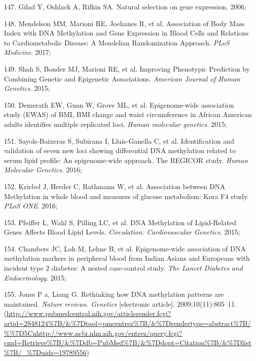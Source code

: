 \documentclass[11pt,oneside]{bristolthesis}
\newenvironment{cslreferences}%
  {}%
  {\par}
\begin{document}
\begin{cslreferences}
\leavevmode\hypertarget{ref-Gilad2006}{}%
147. Gilad Y, Oshlack A, Rifkin SA. Natural selection on gene expression. 2006;

\leavevmode\hypertarget{ref-Mendelson2017}{}%
148. Mendelson MM, Marioni RE, Joehanes R, et al. Association of Body Mass Index with DNA Methylation and Gene Expression in Blood Cells and Relations to Cardiometabolic Disease: A Mendelian Randomization Approach. \emph{PLoS Medicine}. 2017;

\leavevmode\hypertarget{ref-Shah2015}{}%
149. Shah S, Bonder MJ, Marioni RE, et al. Improving Phenotypic Prediction by Combining Genetic and Epigenetic Associations. \emph{American Journal of Human Genetics}. 2015;

\leavevmode\hypertarget{ref-Demerath2015}{}%
150. Demerath EW, Guan W, Grove ML, et al. Epigenome-wide association study (EWAS) of BMI, BMI change and waist circumference in African American adults identifies multiple replicated loci. \emph{Human molecular genetics}. 2015;

\leavevmode\hypertarget{ref-Sayols-Baixeras2016}{}%
151. Sayols-Baixeras S, Subirana I, Lluis-Ganella C, et al. Identification and validation of seven new loci showing differential DNA methylation related to serum lipid profile: An epigenome-wide approach. The REGICOR study. \emph{Human Molecular Genetics}. 2016;

\leavevmode\hypertarget{ref-Kriebel2016}{}%
152. Kriebel J, Herder C, Rathmann W, et al. Association between DNA Methylation in whole blood and measures of glucose metabolism: Kora F4 study. \emph{PLoS ONE}. 2016;

\leavevmode\hypertarget{ref-Pfeiffer2015}{}%
153. Pfeiffer L, Wahl S, Pilling LC, et al. DNA Methylation of Lipid-Related Genes Affects Blood Lipid Levels. \emph{Circulation: Cardiovascular Genetics}. 2015;

\leavevmode\hypertarget{ref-Chambers2015}{}%
154. Chambers JC, Loh M, Lehne B, et al. Epigenome-wide association of DNA methylation markers in peripheral blood from Indian Asians and Europeans with incident type 2 diabetes: A nested case-control study. \emph{The Lancet Diabetes and Endocrinology}. 2015;

\leavevmode\hypertarget{ref-Jones2009}{}%
155. Jones P a, Liang G. Rethinking how DNA methylation patterns are maintained. \emph{Nature reviews. Genetics} {[}electronic article{]}. 2009;10(11):805--11. (\url{http://www.pubmedcentral.nih.gov/articlerender.fcgi?artid=2848124\%7B/\&\%7Dtool=pmcentrez\%7B/\&\%7Drendertype=abstract\%7B/\%\%7D5Cnhttp://www.ncbi.nlm.nih.gov/entrez/query.fcgi?cmd=Retrieve\%7B/\&\%7Ddb=PubMed\%7B/\&\%7Ddopt=Citation\%7B/\&\%7Dlist\%7B/_\%7Duids=19789556})


\end{cslreferences}
\end{document}
